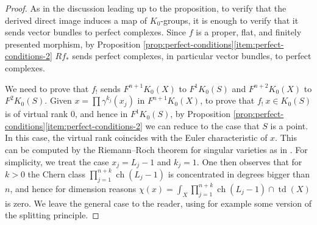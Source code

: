 \documentclass[11pt]{article}
\theoremstyle{plain}
\theoremstyle{definition}
\DeclareMathOperator{\ch}{ch}
\DeclareMathOperator{\td}{td}
\begin{document}
\begin{proof}
As in the discussion leading up to the proposition, to verify that the derived direct image induces a map of $K_0$-groups, it is enough to verify that it sends vector bundles to perfect complexes. Since $f$ is a proper, flat, and finitely presented morphism, by Proposition \ref{prop:perfect-conditions}\eqref{item:perfect-conditions-2} $Rf_{\ast}$ sends perfect complexes, in particular vector bundles, to perfect complexes.

We need to prove that $f_!$ sends $F^{n+1} K_0(X)$ to $F^1 K_0(S)$ and $F^{n+2} K_0(X)$ to $F^2 K_0(S)$. Given $x=\prod \gamma^{k_j}(x_j)$ in $F^{n+1} K_0(X)$, to prove that $f_!\ x \in K_0(S)$ is of virtual rank 0, and hence in $F^1 K_0(S)$, by Proposition \ref{prop:perfect-conditions}\eqref{item:perfect-conditions-2} we can reduce to the case that $S$ is a point. In this case, the virtual rank coincides with the Euler characteristic of $x$. This can be computed by the Riemann--Roch theorem for singular varieties as in \cite[Cor.\,18.3.1]{Fulton}. For simplicity, we treat the case $x_j = L_j-1$ and $k_j=1$. One then observes that for $k>0$ the Chern class $\prod_{j=1}^{n+k}\ch(L_{j}-1)$ is concentrated in degrees bigger than $n$, and hence for dimension reasons $\chi(x) = \int_{X} \prod_{j=1}^{n+k}\ch(L_{j}-1) \cap \td(X)$ is zero. We leave the general case to the reader, using for example some version of the splitting principle.


\end{proof}
\end{document}
